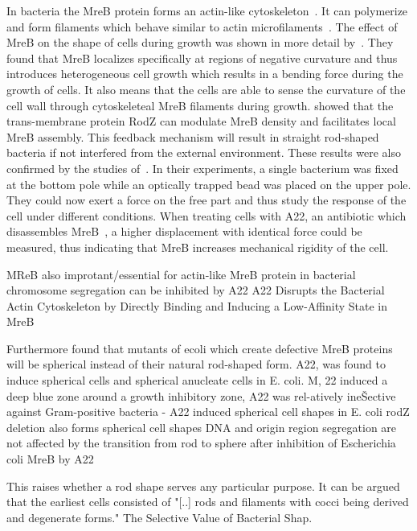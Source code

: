 \documentclass{article}
\begin{document}
In bacteria the MreB protein forms an actin-like cytoskeleton~\cite{Erickson2001}.
It can polymerize and form filaments which behave similar to actin microfilaments~\cite{Dersch2020}.
The effect of MreB on the shape of cells during growth was shown in more detail
by~\cite{Ursell2014}.
They found that MreB localizes specifically at regions of negative curvature and thus introduces
heterogeneous cell growth which results in a bending force during the growth of cells.
It also means that the cells are able to sense the curvature of the cell wall through cytoskeleteal
MreB filaments during growth.
\cite{Bratton2018} showed that the trans-membrane protein RodZ can modulate MreB density and
facilitates local MreB assembly.
This feedback mechanism will result in straight rod-shaped bacteria if not interfered from the
external environment.
These results were also confirmed by the studies of~\cite{Wang2010}.
In their experiments, a single bacterium was fixed at the bottom pole while an optically trapped
bead was placed on the upper pole.
They could now exert a force on the free part and thus study the response of the cell under
different conditions.
When treating cells with A22, an antibiotic which disassembles
MreB~\cite{IWAI2002,Gitai2005,Karczmarek2007,Bean2009}, a higher displacement with identical force
could be measured, thus indicating that MreB increases mechanical rigidity of the cell.

MReB also improtant/essential for actin-like MreB protein in bacterial chromosome segregation can be inhibited by A22 \cite{Gitai2005}A22 Disrupts the Bacterial Actin Cytoskeleton by Directly Binding and Inducing a Low-Affinity State in MreB \cite{Bean2009}


Furthermore \cite{Wachi1987} found that mutants of \ac{ecoli} which create defective MreB proteins will be spherical instead of their natural rod-shaped form.
A22, was found to induce spherical cells and spherical anucleate cells in E. coli. M, 22 induced a deep blue zone around a growth inhibitory zone, A22 was rel-atively ineŠective against Gram-positive bacteria - A22 induced spherical cell shapes in E. coli \cite{IWAI2002} 
rodZ deletion also forms spherical cell shapes \cite{Shiomi2008}
DNA and origin region segregation are not affected by the transition from rod to sphere after inhibition of Escherichia coli MreB by A22 \cite{Karczmarek2007}

This raises whether a rod shape serves any particular purpose.
It can be argued that the earliest cells consisted of "[..] rods and filaments with cocci being
derived and degenerate forms." \cite{Young2006} The Selective Value of Bacterial Shap.
\end{document}
